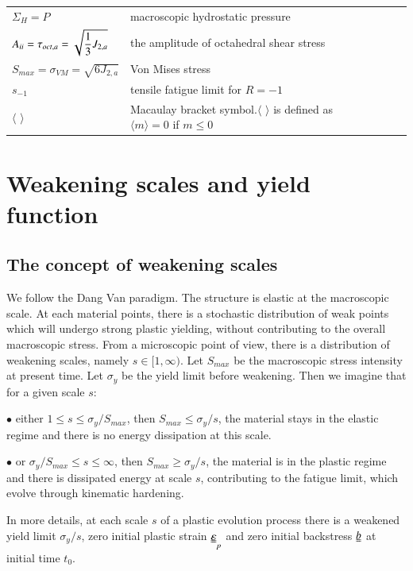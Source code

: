 \documentclass[3p,times,number,review]{elsarticle}
\begin{document}
\begin{flushleft}
\begin{table}[h]
\begin{tabular}{lllll}
			$\Sigma_H=P$& macroscopic hydrostatic pressure &  &  &  \\
			$A_{\uppercase\expandafter{\romannumeral2}}=\tau_{oct,a}=\sqrt{\dfrac{1}{3}J_{2,a}}$& the amplitude of octahedral shear stress &  &  &  \\
			$S_{max}=\sigma_{VM}=\sqrt{6J_{2,a}}$& Von Mises stress &  &  &  \\
			$s_{-1}$& tensile fatigue limit for $R=-1$  &  &  &  \\
			$\langle$ $\rangle$& Macaulay bracket symbol.$\langle$ $\rangle$ is defined as $\langle m\rangle=0$ if $m\leqslant0$
	\end{tabular}
	\end{table}
\end{flushleft}

\clearpage



\section{Weakening scales and yield function}
\subsection{The concept of weakening scales} 

We follow the Dang Van paradigm. The structure is elastic at the macroscopic scale. At each material points, there is a stochastic distribution of weak points which will undergo strong plastic yielding, without contributing to the overall macroscopic stress. From a microscopic point of view, there is a distribution of weakening scales, namely $s\in[1,\infty)$. Let $S_{max}$ be the macroscopic stress intensity at present time. Let $\sigma_y$ be the yield limit before weakening. Then we imagine that for a given scale $s$:

\vspace{6pt}
\noindent
$\bullet$ either $1\leqslant s\leqslant \sigma_y/S_{max}$, then $S_{max}\leqslant \sigma_y/s$, the material stays in the elastic regime and there is no energy dissipation at this scale.

\vspace{6pt}
\noindent
$\bullet$ or $\sigma_y/S_{max}\leqslant s\leqslant \infty$, then $S_{max}\geqslant \sigma_y/s$, the material is in the plastic regime and there is dissipated energy at scale $s$, contributing to the fatigue limit, which evolve through kinematic hardening.

In more details, at each scale $s$ of a plastic evolution process there is a weakened yield limit $\sigma_y/s$, zero initial plastic strain $\uuline{\varepsilon}_p$ and zero initial backstress $\uuline{b}$ at initial time $t_0$.
\end{document}
